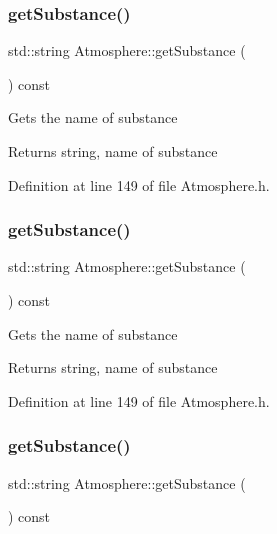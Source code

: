 \subsubsection{\texorpdfstring{get\+Substance()}{getSubstance()}\hspace{0.1cm}{\footnotesize\ttfamily [1/3]}}
{\footnotesize\ttfamily std\+::string Atmosphere\+::get\+Substance (\begin{DoxyParamCaption}{ }\end{DoxyParamCaption}) const\hspace{0.3cm}{\ttfamily [inline]}}

Gets the name of substance \begin{DoxyReturn}{Returns}
string, name of substance 
\end{DoxyReturn}


Definition at line 149 of file Atmosphere.\+h.

\mbox{\label{class_atmosphere_a3ac0fb0d4fc92edc690e44b40b7018c2}} 
\subsubsection{\texorpdfstring{get\+Substance()}{getSubstance()}\hspace{0.1cm}{\footnotesize\ttfamily [2/3]}}
{\footnotesize\ttfamily std\+::string Atmosphere\+::get\+Substance (\begin{DoxyParamCaption}{ }\end{DoxyParamCaption}) const\hspace{0.3cm}{\ttfamily [inline]}}

Gets the name of substance \begin{DoxyReturn}{Returns}
string, name of substance 
\end{DoxyReturn}


Definition at line 149 of file Atmosphere.\+h.

\mbox{\label{class_atmosphere_a3ac0fb0d4fc92edc690e44b40b7018c2}} 
\subsubsection{\texorpdfstring{get\+Substance()}{getSubstance()}\hspace{0.1cm}{\footnotesize\ttfamily [3/3]}}
{\footnotesize\ttfamily std\+::string Atmosphere\+::get\+Substance (\begin{DoxyParamCaption}{ }\end{DoxyParamCaption}) const\hspace{0.3cm}{\ttfamily [inline]}}


